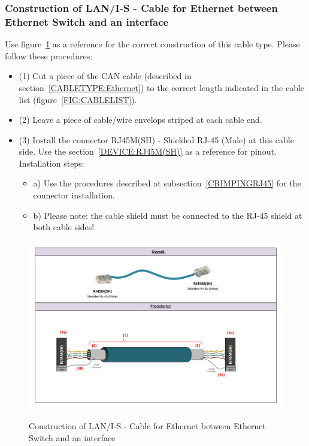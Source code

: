 \subsubsection{Construction of LAN/I-S - Cable for Ethernet between Ethernet Switch and an interface} \label{CONSTRUCTION:LANIS}
Use figure~\ref{FIG:LANISconstruction} as a reference for the correct construction of this cable type. Please follow these procedures:
\begin{itemize}
  \item (1) Cut a piece of the CAN cable (described in section~\ref{CABLETYPE:Ethernet}) to the correct length indicated in the cable list (figure~\ref{FIG:CABLELIST}).
  \item (2) Leave a piece of cable/wire envelops striped at each cable end.
  \item (3) Install the connector RJ45M(SH) - Shielded RJ-45 (Male) at this cable side. Use the section~\ref{DEVICE:RJ45M(SH)} as a reference for pinout. Installation steps:
  \begin{itemize}
    \item a) Use the procedures described at subsection~\ref{CRIMPINGRJ45} for the connector installation.
    \item b) Please note: the cable shield must be connected to the RJ-45 shield at both cable sides!
  \end{itemize}
\end{itemize}
\begin{figure}
  \centering
  \includegraphics[angle=90,width=1\columnwidth]{figs/body03/FIGLANISconstruction.pdf}\\
  \caption[Construction of LAN/I-S - Cable for Ethernet between Ethernet Switch and an interface]{Construction of LAN/I-S - Cable for Ethernet between Ethernet Switch and an interface}
  \label{FIG:LANISconstruction}
\end{figure}

